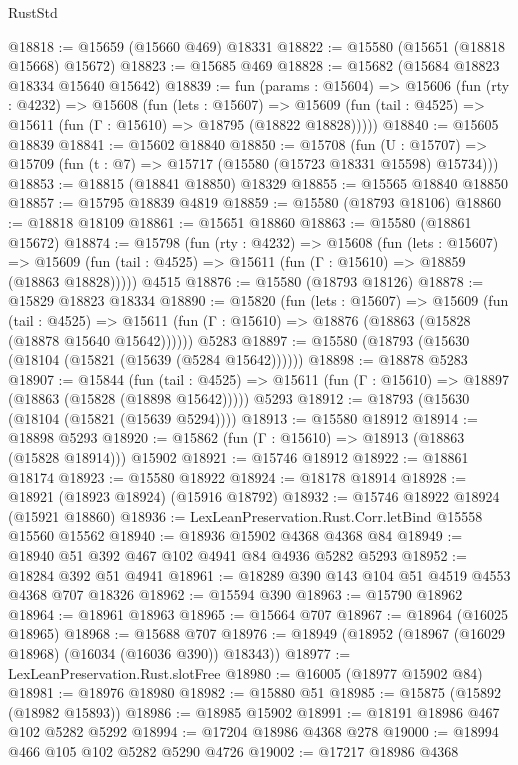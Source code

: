 \begin{lexlean}{RustStd}
\begin{coremodule}
@18818 := @15659 (@15660 @469) @18331
@18822 := @15580 (@15651 (@18818 @15668) @15672)
@18823 := @15685 @469
@18828 := @15682 (@15684 @18823 @18334 @15640 @15642)
@18839 := fun (params : @15604) =>
  @15606
    (fun (rty : @4232) =>
    @15608
      (fun (lets : @15607) =>
      @15609 (fun (tail : @4525) => @15611 (fun (Γ : @15610) => @18795 (@18822 @18828)))))
@18840 := @15605 @18839
@18841 := @15602 @18840
@18850 := @15708
    (fun (U : @15707) => @15709 (fun (t : @7) => @15717 (@15580 (@15723 @18331 @15598) @15734)))
@18853 := @18815 (@18841 @18850) @18329
@18855 := @15565 @18840 @18850
@18857 := @15795 @18839 @4819
@18859 := @15580 (@18793 @18106)
@18860 := @18818 @18109
@18861 := @15651 @18860
@18863 := @15580 (@18861 @15672)
@18874 := @15798
    (fun (rty : @4232) =>
    @15608
      (fun (lets : @15607) =>
      @15609 (fun (tail : @4525) => @15611 (fun (Γ : @15610) => @18859 (@18863 @18828)))))
    @4515
@18876 := @15580 (@18793 @18126)
@18878 := @15829 @18823 @18334
@18890 := @15820
    (fun (lets : @15607) =>
    @15609
      (fun (tail : @4525) =>
      @15611 (fun (Γ : @15610) => @18876 (@18863 (@15828 (@18878 @15640 @15642))))))
    @5283
@18897 := @15580 (@18793 (@15630 (@18104 (@15821 (@15639 (@5284 @15642))))))
@18898 := @18878 @5283
@18907 := @15844
    (fun (tail : @4525) => @15611 (fun (Γ : @15610) => @18897 (@18863 (@15828 (@18898 @15642)))))
    @5293
@18912 := @18793 (@15630 (@18104 (@15821 (@15639 @5294))))
@18913 := @15580 @18912
@18914 := @18898 @5293
@18920 := @15862 (fun (Γ : @15610) => @18913 (@18863 (@15828 @18914))) @15902
@18921 := @15746 @18912
@18922 := @18861 @18174
@18923 := @15580 @18922
@18924 := @18178 @18914
@18928 := @18921 (@18923 @18924) (@15916 @18792)
@18932 := @15746 @18922 @18924 (@15921 @18860)
@18936 := LexLeanPreservation.Rust.Corr.letBind @15558 @15560 @15562
@18940 := @18936 @15902 @4368 @4368 @84
@18949 := @18940 @51 @392 @467 @102 @4941 @84 @4936 @5282 @5293
@18952 := @18284 @392 @51 @4941
@18961 := @18289 @390 @143 @104 @51 @4519 @4553 @4368 @707 @18326
@18962 := @15594 @390
@18963 := @15790 @18962
@18964 := @18961 @18963
@18965 := @15664 @707
@18967 := @18964 (@16025 @18965)
@18968 := @15688 @707
@18976 := @18949 (@18952 (@18967 (@16029 @18968) (@16034 (@16036 @390)) @18343))
@18977 := LexLeanPreservation.Rust.slotFree
@18980 := @16005 (@18977 @15902 @84)
@18981 := @18976 @18980
@18982 := @15880 @51
@18985 := @15875 (@15892 (@18982 @15893))
@18986 := @18985 @15902
@18991 := @18191 @18986 @467 @102 @5282 @5292
@18994 := @17204 @18986 @4368 @278
@19000 := @18994 @466 @105 @102 @5282 @5290 @4726
@19002 := @17217 @18986 @4368

\end{coremodule}
\end{lexlean}
